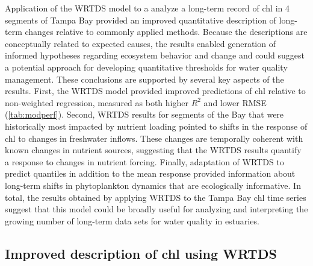 \documentclass[letterpaper,12pt,oneside]{article}\usepackage[]{graphicx}\usepackage[]{color}
\begin{document}
Application of the \acf{WRTDS} model to a analyze a long-term record of \ac{chl} in 4 segments of Tampa Bay provided an improved quantitative description of long-term changes relative to commonly applied methods.  Because the descriptions are conceptually related to expected causes, the results enabled generation of informed hypotheses regarding ecosystem behavior and change and could suggest a potential approach for developing quantitative thresholds for water quality management.   These conclusions are supported by several key aspects of the results.  First, the \ac{WRTDS} model provided improved predictions of \ac{chl} relative to non-weighted regression, measured as both higher $R^2$ and lower \ac{RMSE} (\cref{tab:modperf}).  Second, \ac{WRTDS} results for segments of the Bay that were historically most impacted by nutrient loading pointed to shifts in the response of \ac{chl} to changes in freshwater inflows.  These changes are temporally coherent with known changes in nutrient sources, suggesting that the \ac{WRTDS} results quantify a response to changes in nutrient forcing.  Finally, adaptation of \ac{WRTDS} to predict quantiles in addition to the mean response provided information about long-term shifts in phytoplankton dynamics that are ecologically informative.  In total, the results obtained by applying \ac{WRTDS} to the Tampa Bay \ac{chl} time series suggest that this model could be broadly useful for analyzing and interpreting the growing number of long-term data sets for water quality in estuaries.

\subsection{Improved description of \ac{chl} using \ac{WRTDS}}
\end{document}
